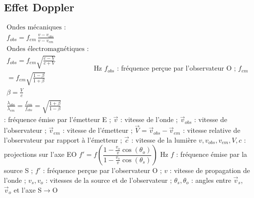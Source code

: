 \subsection{Effet Doppler}
\begin{formules}
    {$\begin{gathered}
      \text{Ondes mécaniques :} \\
      f_{obs} = f_{em}\,\frac{v - v_{obs}}{v - v_{em}} \\
      \text{Ondes électromagnétiques :} \\
      f_{obs} = f_{em}\sqrt{\frac{c - V}{c + V}} \\
      = f_{em}\sqrt{\frac{1 - \beta}{1 + \beta}} \\
      \beta = \frac{V}{c} \\
      \frac{\lambda_{obs}}{\lambda_{em}} = \frac{f_{em}}{f_{obs}} = \sqrt{\frac{1 + \beta}{1 - \beta}}
     \end{gathered}$}
    {Hz}
    {$f_{obs}$ : fréquence perçue par l'observateur O ; $f_{em}$ : fréquence émise par l'émetteur E ;
     $\vec v$ : vitesse de l'onde ; $\vec v_{obs}$ : vitesse de l'observateur ; $\vec v_{em}$ : vitesse de l'émetteur ;
     $\vec V = \vec v_{obs} - \vec v_{em}$ : vitesse relative de l'observateur par rapport à l'émetteur ;
     $\vec c$ : vitesse de la lumière
     $v, v_{obs}, v_{em}, V, c$ : projections sur l'axe EO}
    {$f' = f\left(\dfrac{1 - \frac{v_o}{v}\cos(\theta_o)}{1 - \frac{v_s}{v}\cos(\theta_s)}\right)$}
    {Hz}
    {$f$ : fréquence émise par la source S ; $f'$ : fréquence perçue par l'observateur O ;
     $v$ : vitesse de propagation de l'onde ; $v_s, v_o$ : vitesses de la source et de l'observateur ;
     $\theta_s, \theta_o$ : angles entre $\vec v_s$, $\vec v_o$ et l'axe S$\to$O}
\end{formules}
